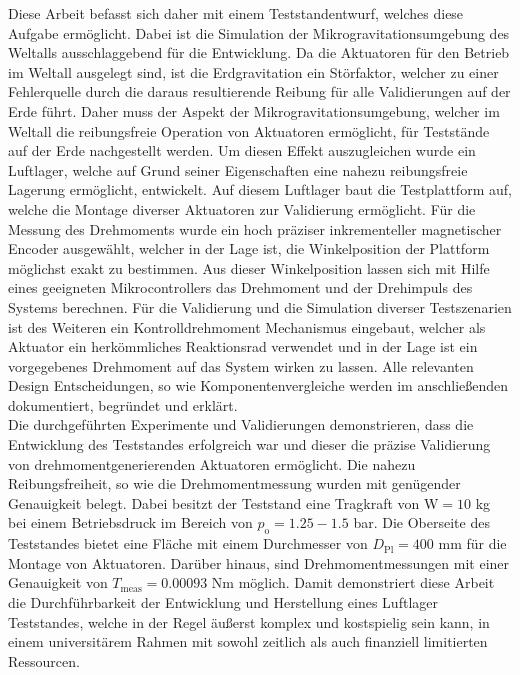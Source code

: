 Diese Arbeit befasst sich daher mit einem Teststandentwurf, welches diese Aufgabe ermöglicht. Dabei ist die Simulation der Mikrogravitationsumgebung des Weltalls ausschlaggebend für die Entwicklung. Da die Aktuatoren für den Betrieb im Weltall ausgelegt sind, ist die Erdgravitation ein Störfaktor, welcher zu einer Fehlerquelle durch die daraus resultierende Reibung für alle Validierungen auf der Erde führt. Daher muss der Aspekt der Mikrogravitationsumgebung, welcher im Weltall die reibungsfreie Operation von Aktuatoren ermöglicht, für Teststände auf der Erde nachgestellt werden. Um diesen Effekt auszugleichen wurde ein Luftlager, welche auf Grund seiner Eigenschaften eine nahezu reibungsfreie Lagerung ermöglicht, entwickelt. Auf diesem Luftlager baut die Testplattform auf, welche die Montage diverser Aktuatoren zur Validierung ermöglicht. Für die Messung des Drehmoments wurde ein hoch präziser inkrementeller magnetischer Encoder ausgewählt, welcher in der Lage ist, die Winkelposition der Plattform möglichst exakt zu bestimmen. Aus dieser Winkelposition lassen sich mit Hilfe eines geeigneten Mikrocontrollers das Drehmoment und der Drehimpuls des Systems berechnen. Für die Validierung und die Simulation diverser Testszenarien ist des Weiteren ein Kontrolldrehmoment Mechanismus eingebaut, welcher als Aktuator ein herkömmliches Reaktionsrad verwendet und in der Lage ist ein vorgegebenes Drehmoment auf das System wirken zu lassen. Alle relevanten Design Entscheidungen, so wie Komponentenvergleiche werden im anschließenden dokumentiert, begründet und erklärt.\\

Die durchgeführten Experimente und Validierungen demonstrieren, dass die Entwicklung des Teststandes erfolgreich war und dieser die präzise Validierung von drehmomentgenerierenden Aktuatoren ermöglicht. Die nahezu Reibungsfreiheit, so wie die Drehmomentmessung wurden mit genügender Genauigkeit belegt. Dabei besitzt der Teststand eine Tragkraft von W$= 10$ kg bei einem Betriebsdruck im Bereich von $p_\text{o} = 1.25 - 1.5$ bar. Die Oberseite des Teststandes bietet eine Fläche mit einem Durchmesser von $D_\text{Pl} = 400$ mm für die Montage von Aktuatoren. Darüber hinaus, sind Drehmomentmessungen mit einer Genauigkeit von $T_\text{meas} = 0.00093$ Nm möglich. Damit demonstriert diese Arbeit die Durchführbarkeit der Entwicklung und Herstellung eines Luftlager Teststandes, welche in der Regel äußerst komplex und kostspielig sein kann, in einem universitärem Rahmen mit sowohl zeitlich als auch finanziell limitierten Ressourcen.


